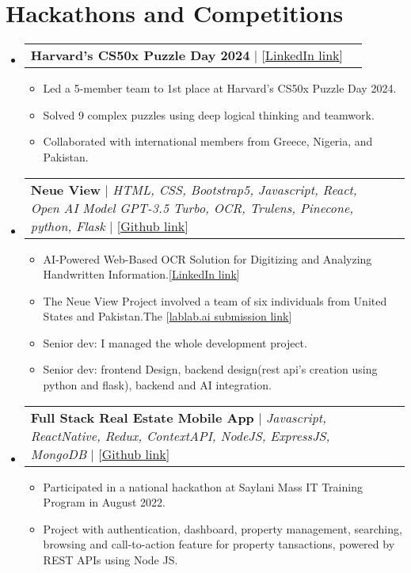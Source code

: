 \documentclass[letterpaper,11pt]{article}
\makeatletter
\newcommand{\resumeItem}[1]{
  \item\small{
    {#1 \vspace{-2pt}}
  }
}
\newcommand{\resumeProjectHeading}[2]{
    \item
    \begin{tabular*}{0.97\textwidth}{l@{\extracolsep{\fill}}r}
      \small#1 & #2 \\
    \end{tabular*}\vspace{-7pt}
}
\newcommand{\resumeSubHeadingListStart}{\begin{itemize}[leftmargin=0.15in, label={}]}
\newcommand{\resumeSubHeadingListEnd}{\end{itemize}}
\newcommand{\resumeItemListStart}{\begin{itemize}}
\newcommand{\resumeItemListEnd}{\end{itemize}\vspace{-5pt}}
\makeatother
\begin{document}
\section{\textbf{Hackathons and Competitions}}
\resumeSubHeadingListStart
\resumeProjectHeading
{\textbf{{Harvard's CS50x Puzzle Day 2024}} $|$ [{\href{https://www.linkedin.com/feed/update/urn:li:activity:7184212040717131778/}{\underline{LinkedIn link}}}]}{}
\resumeItemListStart
\resumeItem{Led a 5-member team to 1st place at Harvard's CS50x Puzzle Day 2024.}
\resumeItem{Solved 9 complex puzzles using deep logical thinking and teamwork.}
\resumeItem{Collaborated with international members from Greece, Nigeria, and Pakistan.}
\resumeItemListEnd
\resumeProjectHeading
{\textbf{{Neue View}} $|$ \emph{HTML, CSS, Bootstrap5, Javascript, React, Open AI Model GPT-3.5 Turbo, OCR, Trulens, Pinecone, python, Flask} $|$ [{\href{https://github.com/Ahmadjajja/neue-view}{\underline{Github link}}}]} {}
\resumeItemListStart
\resumeItem{AI-Powered Web-Based OCR Solution for Digitizing and Analyzing Handwritten Information.[{\href{https://www.linkedin.com/feed/update/urn:li:activity:7167991035099385856/}{\underline{LinkedIn link}}}]}
\resumeItem{The Neue View Project involved a team of six individuals from United States and Pakistan.The [{\href{https://lablab.ai/event/gpt-4-powered-app-creation-hackathon/neue-view/neue-view}{\underline{lablab.ai submission link}}}]}
\resumeItem{Senior dev: I managed the whole development project.}
\resumeItem{Senior dev: frontend Design, backend design(rest api's creation using python and flask), backend and AI integration.}
\resumeItemListEnd
\resumeProjectHeading
{\textbf{{Full Stack Real Estate Mobile App}} $|$ \emph{Javascript, ReactNative, Redux, ContextAPI, NodeJS,
    ExpressJS, MongoDB} $|$ [{\href{https://github.com/Ahmadjajja/Social_Real_Estate_System_Mobile_App_Frontend}{\underline{Github link}}}]}{}
\resumeItemListStart
\resumeItem{Participated in a national hackathon at Saylani Mass IT Training Program in August 2022.}
\resumeItem{Project with authentication, dashboard, property
  management, searching, browsing and call-to-action feature for property
  tansactions, powered by REST APIs using Node JS.}
\resumeItemListEnd
\resumeSubHeadingListEnd
%

\end{document}
